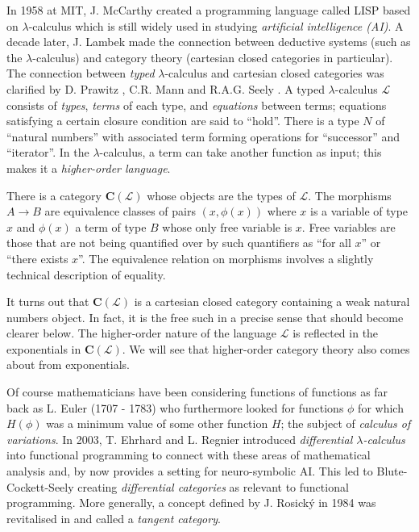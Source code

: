 \documentclass[a4paper,12pt]{article}
\theoremstyle{step}
\def\CL{{\mathscr L}}
\begin{document}
 In 1958 at MIT, J. McCarthy created a programming language called LISP based on 
 $\lambda$-calculus which is still widely used in studying {\em artificial intelligence (AI)}. A decade later, J. Lambek \cite{Lam} made the connection between deductive systems (such as the $\lambda$-calculus) and category theory (cartesian closed categories in particular). The connection between {\em typed} $\lambda$-calculus and cartesian closed categories was clarified by D. Prawitz \cite{Pra}, C.R. Mann \cite{Man} and R.A.G. Seely \cite{See}. A typed $\lambda$-calculus $\CL$ consists of {\em types}, {\em terms} of each type, and {\em equations} between terms; equations satisfying a certain closure condition are said to ``hold''. There is a type $N$ of ``natural numbers'' with associated term forming operations for ``successor'' and ``iterator''. In the $\lambda$-calculus, a term can take another function as input; this makes it a {\em higher-order language}. 
   
 There is a category $\mathbf{C}(\CL)$ whose objects are the types of $\CL$. The morphisms
 $A\to B$ are equivalence classes of pairs $(x,\phi(x))$ where $x$ is a variable of type $x$
 and $\phi(x)$ a term of type $B$ whose only free variable is $x$. Free variables are those
 that are not being quantified over by such quantifiers as ``for all $x$'' or ``there exists $x$''.
 The equivalence relation on morphisms involves a slightly technical description of equality. 
 
 It turns out that $\mathbf{C}(\CL)$ is a cartesian closed category containing a weak natural numbers object. In fact, it is the free such in a precise sense that should become clearer below. 
 The higher-order nature of the language $\CL$ is reflected in the exponentials in $\mathbf{C}(\CL)$. We will see that higher-order category theory also comes about from exponentials.   
 
 Of course mathematicians have been considering functions of
 functions as far back as L. Euler (1707 - 1783) who furthermore looked for functions $\phi$ for which 
 $H(\phi)$ was a minimum value of some other function $H$; the subject of {\em calculus of variations}. 
 In 2003, T. Ehrhard and L. Regnier introduced {\em differential $\lambda$-calculus} into functional programming to connect with these areas of mathematical analysis and, by now provides a setting for neuro-symbolic AI. This led to Blute-Cockett-Seely \cite{BluCocSee} creating {\em differential categories} as relevant to functional programming.
More generally, a concept defined by J. Rosick\'y \cite{Ros} in 1984 was revitalised in \cite{BluCocSee2} and called a {\em tangent category}.    
\end{document}
